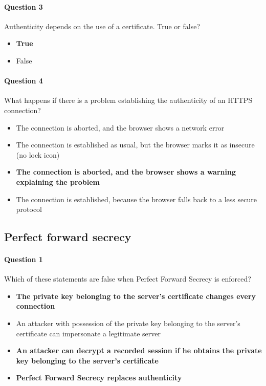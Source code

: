 \documentclass[titlepage]{article}
\begin{document}
    \paragraph{Question 3} Authenticity depends on the use of a certificate. True or false?
    \begin{itemize}
        \item \textbf{True} \checkmark
        \item False
    \end{itemize}
    \paragraph{Question 4} What happens if there is a problem establishing the authenticity of an HTTPS connection?
    \begin{itemize}
        \item The connection is aborted, and the browser shows a network error
        \item The connection is established as usual, but the browser marks it as insecure (no lock icon)
        \item \textbf{The connection is aborted, and the browser shows a warning explaining the problem} \checkmark
        \item The connection is established, because the browser falls back to a less secure protocol
    \end{itemize}
    \subsection{Perfect forward secrecy}
    \paragraph{Question 1} Which of these statements are false when Perfect Forward Secrecy is enforced?
    \begin{itemize}
        \item \textbf{The private key belonging to the server's certificate changes every connection} \checkmark
        \item An attacker with possession of the private key belonging to the server's certificate can impersonate a legitimate server
        \item \textbf{An attacker can decrypt a recorded session if he obtains the private key belonging to the server's certificate} \checkmark
        \item \textbf{Perfect Forward Secrecy replaces authenticity} \checkmark
    \end{itemize}
\end{document}
